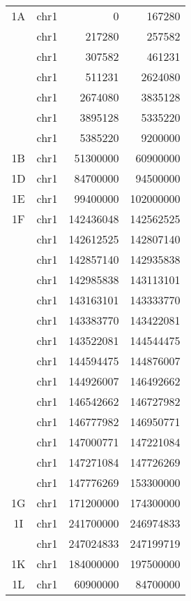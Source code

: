 \begin{center}
\begin{longtable}{@{\extracolsep{\fill}}ccrr}
  \bottomrule
  \bottomrule
  \endlastfoot%
  1A     & chr1       & 0         & 167280 \\
         & chr1       & 217280    & 257582 \\
         & chr1       & 307582    & 461231 \\
         & chr1       & 511231    & 2624080 \\
         & chr1       & 2674080   & 3835128 \\
         & chr1       & 3895128   & 5335220 \\
         & chr1       & 5385220   & 9200000 \\
  1B     & chr1       & 51300000  & 60900000 \\
  1D     & chr1       & 84700000  & 94500000 \\
  1E     & chr1       & 99400000  & 102000000 \\
  1F     & chr1       & 142436048 & 142562525 \\
         & chr1       & 142612525 & 142807140 \\
         & chr1       & 142857140 & 142935838 \\
         & chr1       & 142985838 & 143113101 \\
         & chr1       & 143163101 & 143333770 \\
         & chr1       & 143383770 & 143422081 \\
         & chr1       & 143522081 & 144544475 \\
         & chr1       & 144594475 & 144876007 \\
         & chr1       & 144926007 & 146492662 \\
         & chr1       & 146542662 & 146727982 \\
         & chr1       & 146777982 & 146950771 \\
         & chr1       & 147000771 & 147221084 \\
         & chr1       & 147271084 & 147726269 \\
         & chr1       & 147776269 & 153300000 \\
  1G     & chr1       & 171200000 & 174300000 \\
  1I     & chr1       & 241700000 & 246974833 \\
         & chr1       & 247024833 & 247199719 \\
  1K     & chr1       & 184000000 & 197500000 \\
  1L     & chr1       & 60900000  & 84700000 \\

\end{longtable}
\end{center}
